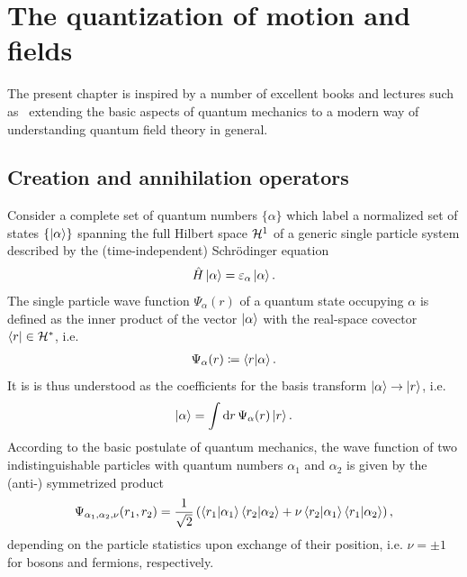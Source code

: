 \chapter{The quantization of motion and fields}
\label{ch:the_quantization_of_motion_and_fields}
The present chapter is inspired by a number of excellent books and lectures such as~\cite{AshcroftMermin1978,AltlandSimons2010,BruusFlensberg2004,Czycholl2016,FetterWalecka2003,Giamarchi2003,Rizzi2016,Burrello2020} extending the basic aspects of quantum mechanics to a modern way of understanding quantum field theory in general.
%
%
\section{Creation and annihilation operators}
\label{sec:creation_and_annihilation_operators}
%
%
Consider a complete set of quantum numbers $\{\alpha\}$ which label a normalized set of states $\{\ket{\alpha}\}$ spanning the full Hilbert space $\mathcal{H}^1$ of a generic single particle system described by the (time-independent) Schrödinger equation
\begin{align}
    \hat H \ket{\alpha} = \varepsilon_\alpha\ket{\alpha}.
\end{align}
The single particle wave function $\Psi_\alpha(r)$ of a quantum state occupying $\alpha$ is defined as the inner product of the vector $\ket{\alpha}$ with the real-space covector $\bra{r}\in\mathcal{H}^*$, i.e.
\begin{align}
    \Psi_\alpha(r) \coloneqq \braket{r|\alpha}.
\end{align}
It is is thus understood as the coefficients for the basis transform $\ket{\alpha}\rightarrow\ket{r}$, i.e.
\begin{align}
    \ket{\alpha} = \int{\rm d}{r}\, \Psi_\alpha(r) \ket{r}.
\end{align}
According to the basic postulate of quantum mechanics, the wave function of two indistinguishable particles with quantum numbers $\alpha_1$ and $\alpha_2$ is given by the (anti-) symmetrized product
\begin{align}
    \Psi_{\alpha_1,\alpha_2,\nu}(r_1,r_2) = \frac1{\sqrt2}\left(\braket{r_1|\alpha_1}\braket{r_2|\alpha_2} + \nu\braket{r_2|\alpha_1}\braket{r_1|\alpha_2}\right),
\end{align}
depending on the particle statistics upon exchange of their position, i.e. $\nu=\pm1$ for bosons and fermions, respectively.
